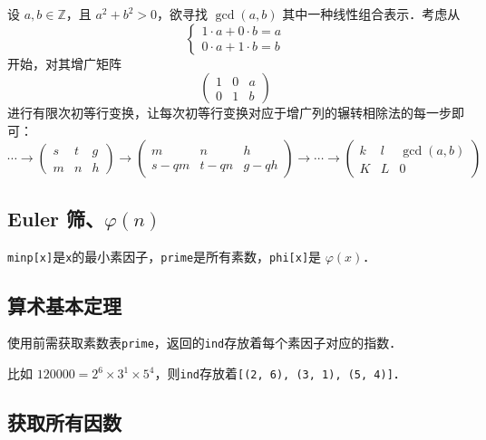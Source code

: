 设 $a, b \in \mathbb Z$，且 $a^2 + b^2 > 0$，欲寻找 $\gcd(a, b)$ 其中一种线性组合表示．考虑从
$$
\begin{cases}
1 \cdot a + 0 \cdot b = a \\
0 \cdot a + 1 \cdot b = b
\end{cases}
$$
开始，对其增广矩阵
$$
\begin{pmatrix}
1 & 0 & a \\
0 & 1 & b
\end{pmatrix}
$$
进行有限次初等行变换，让每次初等行变换对应于增广列的辗转相除法的每一步即可：
$$
\cdots
\rightarrow
\begin{pmatrix}
s & t & g \\
m & n & h
\end{pmatrix}
\rightarrow
\begin{pmatrix}
m & n & h \\
s-qm & t-qn & g-qh
\end{pmatrix}
\rightarrow
\cdots
\rightarrow
\begin{pmatrix}
k & l & \gcd(a, b) \\
K & L & 0
\end{pmatrix}
$$



\subsection{Euler 筛、\texorpdfstring{$\varphi(n)$}{φ(n)}}

{\tt minp[x]}是{\tt x}的最小素因子，{\tt prime}是所有素数，{\tt phi[x]}是 $\varphi(x)$．



\subsection{算术基本定理}

使用前需获取素数表{\tt prime}，返回的{\tt ind}存放着每个素因子对应的指数．

比如 $120000 = 2^6 \times 3^1 \times 5^4$，则{\tt ind}存放着{\tt [(2, 6), (3, 1), (5, 4)]}．



\subsection{获取所有因数}

